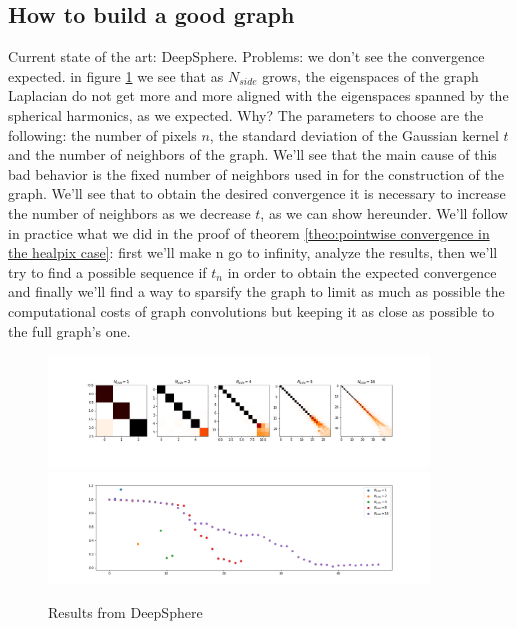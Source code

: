 \subsection{How to build a good graph}
\label{sec:How to build a good graph}
Current state of the art: DeepSphere.
Problems: we don't see the convergence expected. in figure \ref{fig:deepsphere results} we see that as $N_{side}$ grows, the eigenspaces of the graph Laplacian do not get more and more aligned with the eigenspaces spanned by the spherical harmonics, as we expected. Why? The parameters to choose are the following: the number of pixels $n$, the standard deviation of the Gaussian kernel $t$ and the number of neighbors of the graph. We'll see that the main cause of this bad behavior is the fixed number of neighbors used in \cite{DeepSphere} for the construction of the graph. We'll see that to obtain the desired convergence it is necessary to increase the number of neighbors as we decrease $t$, as we can show hereunder. We'll follow in practice what we did in the proof of theorem \ref{theo:pointwise convergence in the healpix case}: first we'll make n go to infinity, analyze the results, then we'll try to find a possible sequence if $t_n$ in order to obtain the expected convergence and finally we'll find a way to sparsify the graph to limit as much as possible the computational costs of graph convolutions but keeping it as close as possible to the full graph's one.
\begin{figure}[h]
	\label{fig:deepsphere results}
	\caption{Results from DeepSphere}
	\centering
	\includegraphics[width=0.9\textwidth]{../codes/02.HeatKernelGraphLaplacian/HEALPix/06_figures/deepsphere_original.png}
	\includegraphics[width=0.9\textwidth]{../codes/02.HeatKernelGraphLaplacian/HEALPix/06_figures/deepsphere_original_diagonal.png}	
\end{figure}
